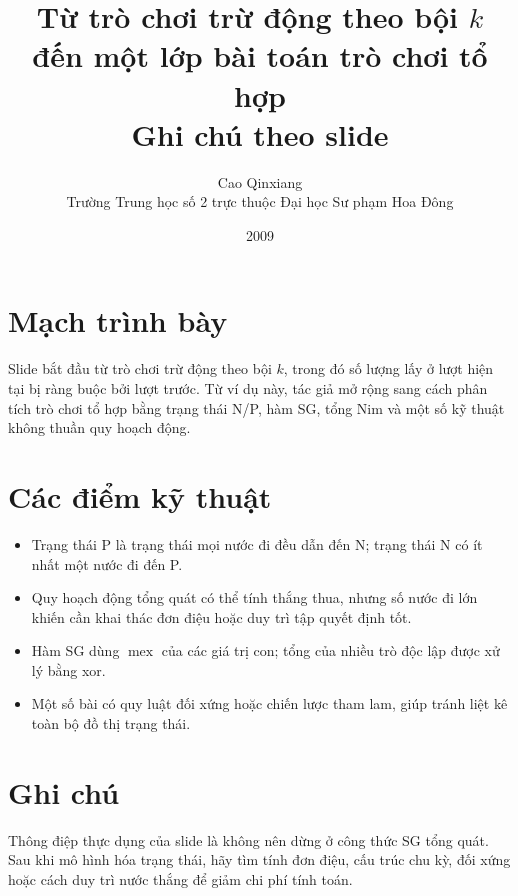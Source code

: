 \documentclass[11pt]{article}
\title{Từ trò chơi trừ động theo bội \(k\) đến một lớp bài toán trò chơi tổ hợp\\{\large Ghi chú theo slide}}
\author{Cao Qinxiang\\Trường Trung học số 2 trực thuộc Đại học Sư phạm Hoa Đông}
\date{2009}
\newcommand{\mex}{\operatorname{mex}}
\begin{document}
\maketitle


\section{Mạch trình bày}

Slide bắt đầu từ trò chơi trừ động theo bội \(k\), trong đó số lượng lấy ở
lượt hiện tại bị ràng buộc bởi lượt trước. Từ ví dụ này, tác giả mở rộng sang
cách phân tích trò chơi tổ hợp bằng trạng thái N/P, hàm SG, tổng Nim và một
số kỹ thuật không thuần quy hoạch động.

\section{Các điểm kỹ thuật}

\begin{itemize}
  \item Trạng thái P là trạng thái mọi nước đi đều dẫn đến N; trạng thái N có
  ít nhất một nước đi đến P.
  \item Quy hoạch động tổng quát có thể tính thắng thua, nhưng số nước đi lớn
  khiến cần khai thác đơn điệu hoặc duy trì tập quyết định tốt.
  \item Hàm SG dùng \(\mex\) của các giá trị con; tổng của nhiều trò độc lập
  được xử lý bằng xor.
  \item Một số bài có quy luật đối xứng hoặc chiến lược tham lam, giúp tránh
  liệt kê toàn bộ đồ thị trạng thái.
\end{itemize}

\section{Ghi chú}

Thông điệp thực dụng của slide là không nên dừng ở công thức SG tổng quát.
Sau khi mô hình hóa trạng thái, hãy tìm tính đơn điệu, cấu trúc chu kỳ, đối
xứng hoặc cách duy trì nước thắng để giảm chi phí tính toán.
\end{document}
